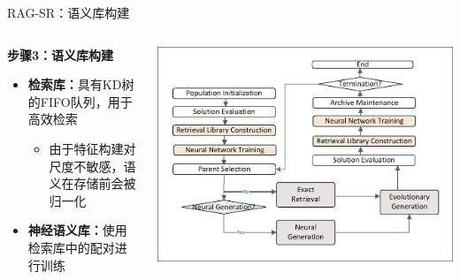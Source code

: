 \documentclass[aspectratio=1610]{beamer}
\begin{document}
    \begin{frame}{RAG-SR：语义库构建}
        \begin{columns}
            \begin{column}{0.5\textwidth}
                \textbf{步骤3：语义库构建}
                \begin{itemize}
                    \item \textbf{检索库：}具有KD树的FIFO队列，用于高效检索
                    \begin{itemize}
                        \item 由于特征构建对尺度不敏感，语义在存储前会被归一化
                    \end{itemize}
                    \item \textbf{神经语义库：}使用检索库中的配对进行训练
                \end{itemize}
            \end{column}
            \begin{column}{0.5\textwidth}
                \includegraphics[width=1.0\textwidth]{figs/Workflow.pdf}
            \end{column}
        \end{columns}
    \end{frame}
\end{document}
